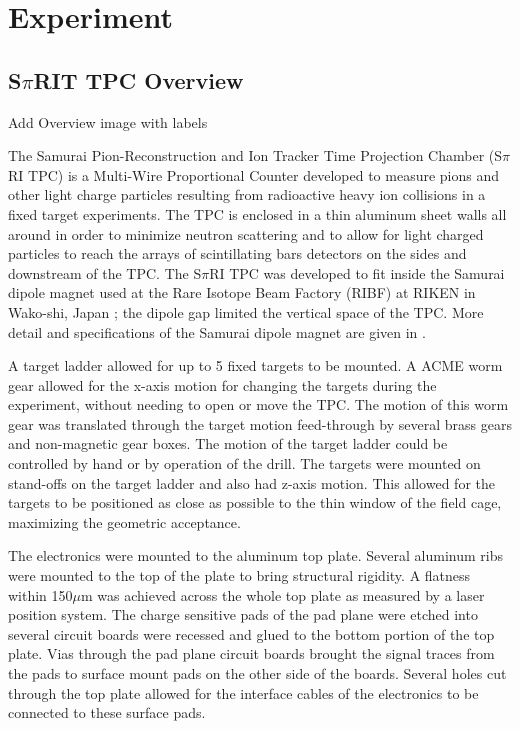 \chapter{Experiment}

\section{S$\pi$RIT TPC Overview}
Add Overview image with labels


The Samurai Pion-Reconstruction and Ion Tracker Time Projection Chamber (S$\pi$RI TPC) is a Multi-Wire Proportional Counter developed to measure pions and other light charge particles resulting from radioactive heavy ion collisions in a fixed target experiments.  The TPC is enclosed in a thin aluminum sheet walls all around in order to minimize neutron scattering and to allow for light charged particles to reach the arrays of scintillating bars detectors on the sides and downstream of the TPC. The S$\pi$RI TPC was developed to fit inside the Samurai dipole magnet used at the Rare Isotope Beam Factory (RIBF) at RIKEN in Wako-shi, Japan \cite{riken}; the dipole gap limited the vertical space of the TPC. More detail and specifications of the Samurai dipole magnet are given in \cite{samurai}. 

A target ladder allowed for up to 5 fixed targets to be mounted. A ACME worm gear allowed for the x-axis motion for changing the targets during the experiment, without needing to open or move the TPC. The motion of this worm gear was translated through the target motion feed-through by several brass gears and non-magnetic gear boxes. The motion of the target ladder could be controlled by hand or by operation of the drill. The targets were mounted on stand-offs on the target ladder and also had z-axis motion. This allowed for the targets to be positioned as close as possible to the thin window of the field cage, maximizing the geometric acceptance. 

The electronics were mounted to the aluminum top plate. Several aluminum ribs were mounted to the top of the plate to bring structural rigidity. A flatness within 150$\mu$m was achieved across the whole top plate as measured by a laser position system. The charge sensitive pads of the pad plane were etched into several circuit boards were recessed and glued to the bottom portion of the top plate. Vias through the pad plane circuit boards brought the signal traces from the pads to surface mount pads on the other side of the boards. Several holes cut through the top plate allowed for the interface cables of the electronics to be connected to these surface pads. 

